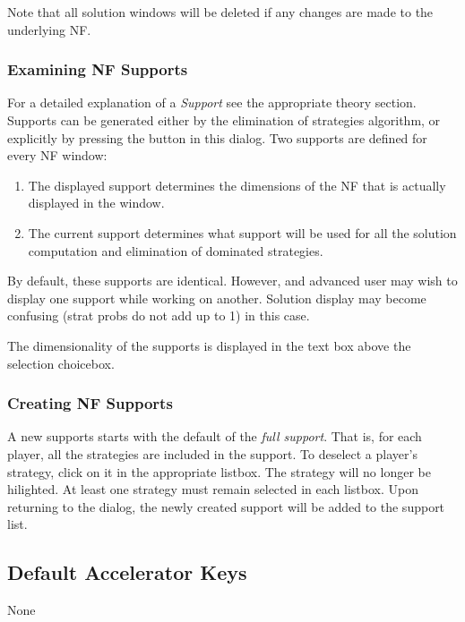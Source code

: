 Note that all solution windows will be deleted if any changes are made to the underlying
NF.



\subsubsection{Examining NF Supports}\label{ElimDomInspect}
For a detailed explanation of a {\em Support} see the appropriate theory section.
Supports can be generated either by the elimination of strategies algorithm,
or explicitly by pressing the  button in this dialog.  Two supports
are defined for every NF window:
\begin{enumerate}
\item The displayed support determines the dimensions of the NF that is actually
displayed in the window.
\item The current support determines what support will be used for all the solution
computation and elimination of dominated strategies. 
\end{enumerate}
By default, these supports are identical.  However, and advanced user may wish to
display one support while working on another.  Solution display may become 
confusing (strat probs do not add up to 1) in this case.

The dimensionality of the supports is displayed in the text box above the selection
choicebox.

\subsubsection{Creating NF Supports}\label{NewSupport}
A new supports starts with the default of the {\em full support}.  That is, for each player,
all the strategies are included in the support.  To deselect a player's strategy, click on it
in the appropriate listbox.  The strategy will no longer be hilighted.  At least one strategy
must remain selected in each listbox.  Upon returning to the  dialog, the newly created support will be added
to the support list.



\subsection{Default Accelerator Keys}\label{NormFormDefAccl}
None


